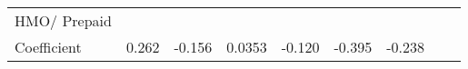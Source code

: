 \documentclass[
]{book}
\begin{document}
\begin{longtable}[]{@{}lllllllll@{}}
\begin{minipage}[t]{0.10\columnwidth}\raggedright
HMO/ Prepaid\strut
\end{minipage} & \begin{minipage}[t]{0.08\columnwidth}\raggedright
\strut
\end{minipage} & \begin{minipage}[t]{0.09\columnwidth}\raggedright
\strut
\end{minipage} & \begin{minipage}[t]{0.07\columnwidth}\raggedright
\strut
\end{minipage} & \begin{minipage}[t]{0.06\columnwidth}\raggedright
\strut
\end{minipage} & \begin{minipage}[t]{0.11\columnwidth}\raggedright
\strut
\end{minipage} & \begin{minipage}[t]{0.07\columnwidth}\raggedright
\strut
\end{minipage} & \begin{minipage}[t]{0.07\columnwidth}\raggedright
\strut
\end{minipage} & \begin{minipage}[t]{0.10\columnwidth}\raggedright
\strut
\end{minipage}\tabularnewline
\begin{minipage}[t]{0.10\columnwidth}\raggedright
Coefficient\strut
\end{minipage} & \begin{minipage}[t]{0.08\columnwidth}\raggedright
0.262\strut
\end{minipage} & \begin{minipage}[t]{0.09\columnwidth}\raggedright
-0.156\strut
\end{minipage} & \begin{minipage}[t]{0.07\columnwidth}\raggedright
0.0353\strut
\end{minipage} & \begin{minipage}[t]{0.06\columnwidth}\raggedright
-0.120\strut
\end{minipage} & \begin{minipage}[t]{0.11\columnwidth}\raggedright
-0.395\strut
\end{minipage} & \begin{minipage}[t]{0.07\columnwidth}\raggedright
-0.238\strut
\end{minipage} & \begin{minipage}[t]{0.07\columnwidth}\raggedright

\end{minipage}
\end{longtable}
\end{document}
